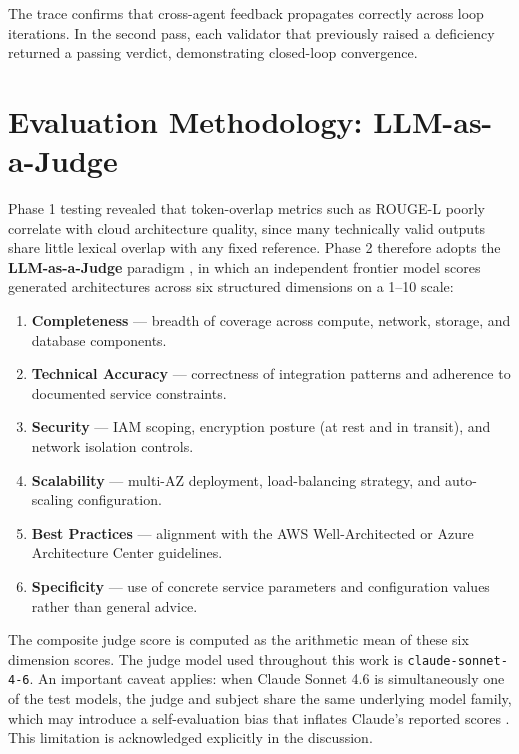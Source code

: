 The trace confirms that cross-agent feedback propagates correctly across loop iterations. In the second pass, each validator that previously raised a deficiency returned a passing verdict, demonstrating closed-loop convergence.

\section{Evaluation Methodology: LLM-as-a-Judge}

Phase 1 testing revealed that token-overlap metrics such as ROUGE-L poorly correlate with cloud architecture quality, since many technically valid outputs share little lexical overlap with any fixed reference. Phase 2 therefore adopts the \textbf{LLM-as-a-Judge} paradigm \cite{zheng2024judging}, in which an independent frontier model scores generated architectures across six structured dimensions on a 1--10 scale:

\begin{enumerate}
    \item \textbf{Completeness} — breadth of coverage across compute, network, storage, and database components.
    \item \textbf{Technical Accuracy} — correctness of integration patterns and adherence to documented service constraints.
    \item \textbf{Security} — IAM scoping, encryption posture (at rest and in transit), and network isolation controls.
    \item \textbf{Scalability} — multi-AZ deployment, load-balancing strategy, and auto-scaling configuration.
    \item \textbf{Best Practices} — alignment with the AWS Well-Architected or Azure Architecture Center guidelines.
    \item \textbf{Specificity} — use of concrete service parameters and configuration values rather than general advice.
\end{enumerate}

The composite judge score is computed as the arithmetic mean of these six dimension scores. The judge model used throughout this work is \texttt{claude-sonnet-4-6}. An important caveat applies: when Claude Sonnet 4.6 is simultaneously one of the test models, the judge and subject share the same underlying model family, which may introduce a self-evaluation bias that inflates Claude's reported scores \cite{zheng2024judging}. This limitation is acknowledged explicitly in the discussion.

